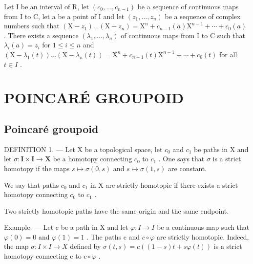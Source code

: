 Let I be an interval of R, let \((c_{0},\ldots,c_{n-1})\) be a sequence of continuous maps from I to C, let a be a point of I and let \((z_{1},\ldots,z_{n})\) be a sequence of complex numbers such that \((\mathrm{X}-z_{1})\ldots(\mathrm{X}-z_{n})=\mathrm{X}^{n}+c_{n-1}(a)\mathrm{X}^{n-1}+\cdots+c_{0}(a)\) . There exists a sequence \((\lambda_{1},\ldots,\lambda_{n})\) of continuous maps from I to C such that \(\lambda_{i}(a)=z_{i}\) for \(1\leqslant i\leqslant n\) and \((\mathrm{X}-\lambda_{1}(t))\ldots(\mathrm{X}-\lambda_{n}(t))=\mathrm{X}^{n}+c_{n-1}(t)\mathrm{X}^{n-1}+\cdots+c_{0}(t)\) for all \(t\in I\) .

\section{POINCARÉ GROUPOID}

\subsection{Poincaré groupoid}

DEFINITION 1. --- Let X be a topological space, let \(c_{0}\) and \(c_{1}\) be paths in X and let \(\sigma\colon\mathbf{I}\times\mathbf{I}\to\mathbf{X}\) be a homotopy connecting \(c_{0}\) to \(c_{1}\) . One says that \(\sigma\) is a strict homotopy if the maps \(s\mapsto\sigma(0,s)\) and \(s\mapsto\sigma(1,s)\) are constant.

We say that paths \(c_{0}\) and \(c_{1}\) in X are strictly homotopic if there exists a strict homotopy connecting \(c_{0}\) to \(c_{1}\) .

Two strictly homotopic paths have the same origin and the same endpoint.

Example. --- Let c be a path in X and let \(\varphi\colon I\to I\) be a continuous map such that \(\varphi(0)=0\) and \(\varphi(1)=1\) . The paths c and \(c\circ\varphi\) are strictly homotopic. Indeed, the map \(\sigma\colon I\times I\to X\) defined by \(\sigma(t,s)=c((1-s)t+s\varphi(t))\) is a strict homotopy connecting c to \(c\circ\varphi\) .

